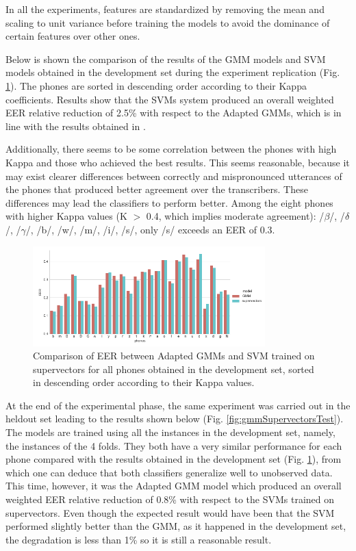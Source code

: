 In all the experiments, features are standardized
by removing the mean and scaling to unit variance
before training the models to avoid the dominance of certain
features over other ones.

Below is shown the
comparison of the results of the GMM models and
SVM models obtained in the development set during the experiment
replication (Fig. \ref{fig:gmmSupervectorsDev}).
The phones are sorted in descending order according to their Kappa coefficients.
Results show that the SVMs system produced an overall weighted EER relative reduction of 2.5\% with
respect to the Adapted GMMs, which is in line with the results obtained
in \cite{main}.

Additionally, there seems to be some correlation between the phones with high Kappa
and those who achieved
the best results. This seems reasonable, because it may exist clearer differences
between correctly and mispronounced
utterances of the phones that produced better agreement over the transcribers.
These differences may lead the classifiers to perform better.
Among the eight phones with higher Kappa values (K $>$ 0.4, which implies moderate agreement):
/$\beta$/, /$\delta$/, /$\gamma$/, /b/, /w/, /m/, /i/, /s/, only /s/ exceeds an EER of 0.3.

\begin{figure}[H]
	\centering
	\includegraphics[width=0.8\textwidth]{files/figures/results/gmm-vs-supervectors/gmm-vs-supervectors-dev.png}
	\caption{Comparison of EER between Adapted GMMs
	and SVM trained on supervectors for all phones obtained in the development set, sorted
	in descending order according to their Kappa values.}
	\label{fig:gmmSupervectorsDev}
\end{figure}

At the end of the experimental phase,
the same experiment was carried out in the heldout set
leading to the results shown below
(Fig. \ref{fig:gmmSupervectorsTest}).
The models are trained using all the instances in the development set, namely, the
instances of the 4 folds.
They both have a very similar performance for each phone compared with the results obtained
in the development set (Fig. \ref{fig:gmmSupervectorsDev}),
from which one can deduce that both classifiers generalize well to
unobserved data. This time, however, it was the Adapted GMM model
which produced an overall weighted EER relative reduction of 0.8\% with respect to the SVMs
trained on supervectors. Even though the expected result would have been that the SVM performed
slightly better than the GMM, as it happened in the development set,
the degradation is less than 1\% so it is still a reasonable result.

